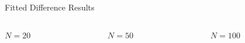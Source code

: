 \documentclass[professionalfont]{beamer}
\theoremstyle{remark}
\begin{document}
\begin{frame}{Fitted Difference Results}
	
	\begin{columns}
		
		\begin{column}{.3\paperwidth}

			\centering
			$N=20$

			\begin{figure}

				
			\end{figure}
			
		\end{column}

		\begin{column}{.3\paperwidth}

			\centering
			$N=50$
			
			\begin{figure}

				
			\end{figure}
			
		\end{column}

		\begin{column}{.3\paperwidth}

			\centering
			$N=100$
			
			\begin{figure}

				
			\end{figure}
	
			
		\end{column}
	\end{columns}
	
\end{frame}
\end{document}
